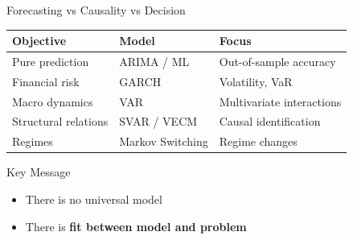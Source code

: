 \documentclass[9pt, aspectratio=169, t]{beamer}
\begin{document}

\begin{frame}{Forecasting vs Causality vs Decision}
    \begin{center}
    \footnotesize
    \begin{tabular}{lll}
        \toprule
        \textbf{Objective} & \textbf{Model} & \textbf{Focus} \\
        \midrule
        Pure prediction & ARIMA / ML & Out-of-sample accuracy \\
        Financial risk & GARCH & Volatility, VaR \\
        Macro dynamics & VAR & Multivariate interactions \\
        Structural relations & SVAR / VECM & Causal identification \\
        Regimes & Markov Switching & Regime changes \\
        \bottomrule
    \end{tabular}
    \end{center}

    \vspace{0.3cm}

    \begin{alertblock}{Key Message}
        \begin{itemize}\setlength{\itemsep}{0pt}
            \item There is no universal model
            \item There is \textbf{fit between model and problem}
        \end{itemize}
    \end{alertblock}
\end{frame}
\end{document}
